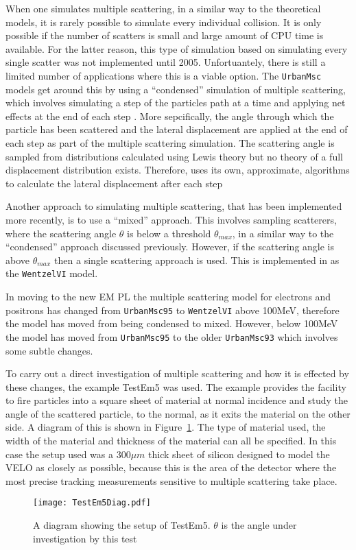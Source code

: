 When one simulates multiple scattering, in a similar way to the theoretical models, it is rarely possible to simulate every individual collision.  It is only possible if the number of scatters is small and large amount of CPU time is available.  For the latter reason, this type of simulation based on simulating every single scatter was not implemented until 2005.  Unfortuantely, there is still a limited number of applications where this is a viable option.  The \texttt{UrbanMsc} models get around this by using  a ``condensed'' simulation of multiple scattering, which involves simulating a step of the particles path at a time and applying net effects at the end of each step \cite{Urbàn:592633}.  More sepcifically, the angle through which the particle has been scattered and the lateral displacement are applied at the end of each step as part of the multiple scattering simulation.  The scattering angle is sampled from distributions calculated using Lewis theory but no theory of a full displacement distribution exists.  Therefore, \geant uses its own, approximate, algorithms to calculate the lateral displacement after each step %

Another approach to simulating multiple scattering, that has been implemented more recently, is to use a ``mixed'' approach.  This involves sampling scatterers, where the scattering angle $\theta$ is below a threshold $\theta_{max}$, in a similar way to the ``condensed'' approach discussed previously.  However, if the scattering angle is above $\theta_{max}$ then a single scattering approach is used.  This is implemented in \geant as the \texttt{WentzelVI} model.

In moving to the new EM PL the multiple scattering model for electrons and positrons has changed from \texttt{UrbanMsc95} to \texttt{WentzelVI} above 100MeV, therefore the model has moved from being condensed to mixed.  However, below 100MeV the model has moved from \texttt{UrbanMsc95} to the older \texttt{UrbanMsc93} which involves some subtle changes. %

To carry out a direct investigation of multiple scattering and how it is effected by these changes, the \geant example TestEm5 was used. The example provides the facility to fire particles into a square sheet of material at normal incidence and study the angle of the scattered particle, to the normal, as it exits the material on the other side. A diagram of this is shown in Figure~\ref{fig:TestDiam}.  The type of material used, the width of the material and thickness of the material can all be specified. In this case the setup used was a $300 \mu m$ thick sheet of silicon designed to model the \lhcb VELO as closely as possible, because this is the area of the detector where the most precise tracking measurements sensitive to multiple scattering take place.
\begin{figure}[h]
  \centering
  \texttt{[image: TestEm5Diag.pdf]}
  \caption{A diagram showing the setup of TestEm5.  $\theta$ is the angle under investigation by this test}
  \label{fig:TestDiam}
\end{figure}

